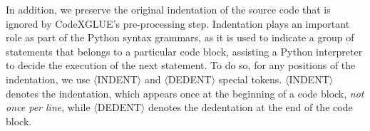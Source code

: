 




In addition, we preserve the original indentation of the source code that is ignored by CodeXGLUE's pre-processing step.
Indentation plays an important role as part of the Python syntax grammars, as it is used to indicate a group of statements that belongs to a particular code block, assisting a Python interpreter to decide the execution of the next statement.
To do so, for any positions of the indentation, we use $\langle$INDENT$\rangle$ and $\langle$DEDENT$\rangle$ special tokens.
$\langle$INDENT$\rangle$ denotes the indentation, which appears once at the beginning of a code block, \emph{not once per line}, while  $\langle$DEDENT$\rangle$ denotes the dedentation at the end of the code block.



